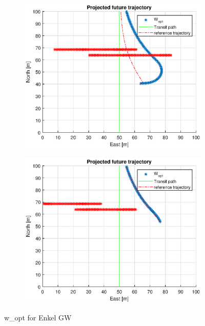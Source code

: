 \begin{figure}
\begin{subfigure}[b]{0.499\textwidth}
    \end{subfigure}
    \hfill
    \\
    \begin{subfigure}[b]{0.49\textwidth}
        \centering
        \includegraphics[width=\textwidth]{Images/Figures/Enkel_GW/Simple0_f999_Frame5}
    \end{subfigure}
    \hfill
    \begin{subfigure}[b]{0.499\textwidth}
        \centering
        \includegraphics[width=\textwidth]{Images/Figures/Enkel_GW/simple0_f999_Frame6}
    \end{subfigure}
    \hfill
    \caption{w\_opt for Enkel GW}
\end{figure}

